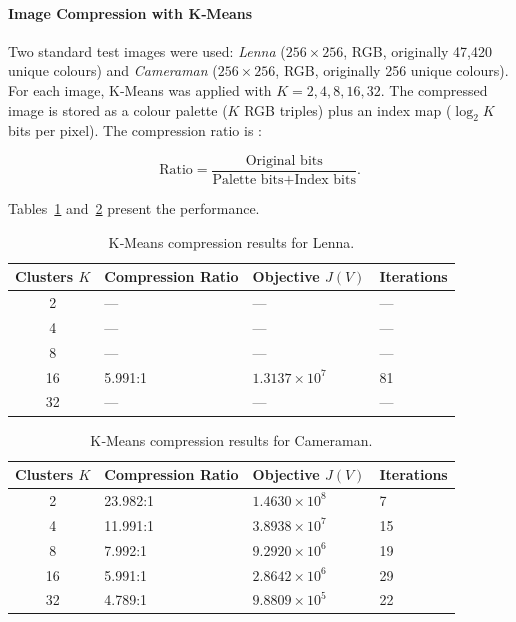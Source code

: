 \paragraph{Image Compression with K‑Means}
Two standard test images were used: \textit{Lenna} ($256\times256$, RGB, originally 47,420 unique colours) and \textit{Cameraman} ($256\times256$, RGB, originally 256 unique colours). For each image, K‑Means was applied with $K = 2,4,8,16,32$. The compressed image is stored as a colour palette ($K$ RGB triples) plus an index map ($\log_2 K$ bits per pixel). The compression ratio is \cite{Salomon1997, Khaleel2014}:

\[
\text{Ratio} = \frac{\text{Original bits}}{\text{Palette bits} + \text{Index bits}}.
\] 

Tables~\ref{tab:lenna_results} and~\ref{tab:cameraman_results} present the performance.

\begin{table}[H]
\centering
\small
\caption{K‑Means compression results for Lenna.}
\label{tab:lenna_results}
\begin{tabularx}{\textwidth}{|c|X|X|X|}
\hline
\textbf{Clusters $K$} & \textbf{Compression Ratio} & \textbf{Objective $J(V)$} & \textbf{Iterations} \\
\hline
2  & — & — & — \\
4  & — & — & — \\
8  & — & — & — \\
16 & 5.991:1 & $1.3137\times10^7$ & 81 \\
32 & — & — & — \\
\hline
\end{tabularx}
\end{table}

\begin{table}[H]
\centering
\small
\caption{K‑Means compression results for Cameraman.}
\label{tab:cameraman_results}
\begin{tabularx}{\textwidth}{|c|X|X|X|}
\hline
\textbf{Clusters $K$} & \textbf{Compression Ratio} & \textbf{Objective $J(V)$} & \textbf{Iterations} \\
\hline
2  & 23.982:1 & $1.4630\times10^8$ & 7 \\
4  & 11.991:1 & $3.8938\times10^7$ & 15 \\
8  & 7.992:1  & $9.2920\times10^6$ & 19 \\
16 & 5.991:1  & $2.8642\times10^6$ & 29 \\
32 & 4.789:1  & $9.8809\times10^5$ & 22 \\
\hline
\end{tabularx}
\end{table}

